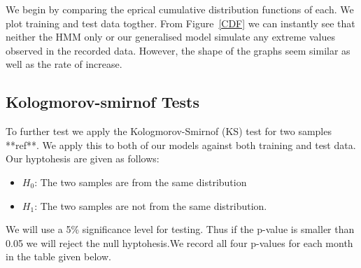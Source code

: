 We begin by comparing the eprical cumulative distribution functions of each. We plot training and test data togther. From Figure~\ref{CDF} we can instantly see that neither the HMM only or our generalised model simulate any extreme values observed in the recorded data. However, the shape of the graphs seem similar as well as the rate of increase.


\subsection{Kologmorov-smirnof Tests}

To further test we apply the Kologmorov-Smirnof (KS) test for two samples **ref**. We apply this to both of our models against both training and test data. Our hyptohesis are given as follows:

\begin{itemize}
    \item $H_0$: The two samples are from the same distribution
    \item $H_1$: The two samples are not from the same distribution.
\end{itemize}

We will use a 5\% significance level for testing. Thus if the p-value is smaller than 0.05 we will reject the null hyptohesis.We record all four p-values for each month in the table given below.

